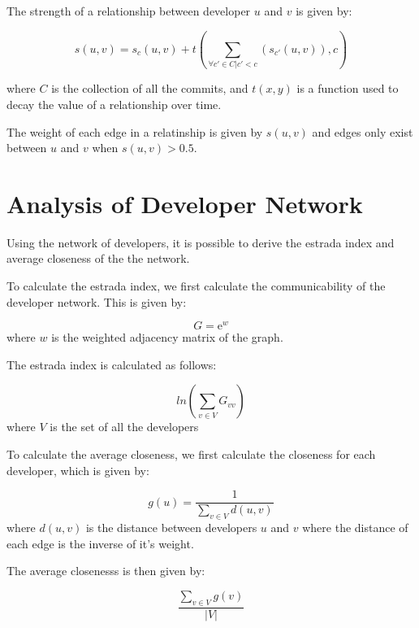 \documentclass[12pt]{article}
\begin{document}
The strength of a relationship between developer $u$ and $v$ is given by:

$$ s(u, v) = s_c(u, v) + t \left( \sum_{\forall c' \in C | c' < c} \left( s_{c'}(u, v) \right), c \right) $$

where $C$ is the collection of all the commits, and $t(x, y)$ is a function used to decay the value of a relationship over time.

The weight of each edge in a relatinship is given by $s(u, v)$ and edges only exist between $u$ and $v$ when $s(u, v) > 0.5$.  


\section{Analysis of Developer Network}

Using the network of developers, it is possible to derive the estrada index and average closeness of the the network.

To calculate the estrada index, we first calculate the communicability of the developer network.  This is given by:

$$ G = \mathrm{e}^{w} $$ where $w$ is the weighted adjacency matrix of the graph.

The estrada index is calculated as follows:

$$ ln \left( \sum_{v \in V} G_{vv} \right) $$ where $V$ is the set of all the developers

To calculate the average closeness, we first calculate the closeness for each developer, which is given by:

$$ g(u) = \frac{1}{\sum_{v \in V} d(u, v)} $$ where $d(u, v)$ is the distance between developers $u$ and $v$ where the distance of each edge is the inverse of it's weight.  

The average closenesss is then given by:

$$ \frac{\sum_{v \in V} g(v)}{|V|} $$
\end{document}
